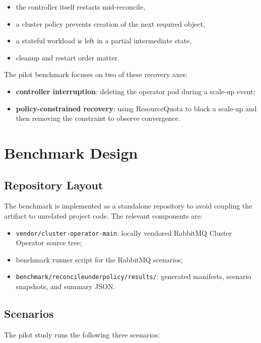 \documentclass[11pt,a4paper]{article}
\begin{document}
\begin{itemize}
  \item the controller itself restarts mid-reconcile,
  \item a cluster policy prevents creation of the next required object,
  \item a stateful workload is left in a partial intermediate state,
  \item cleanup and restart order matter.
\end{itemize}

The pilot benchmark focuses on two of these recovery axes:

\begin{itemize}
  \item \textbf{controller interruption}: deleting the operator pod during a
  scale-up event;
  \item \textbf{policy-constrained recovery}: using ResourceQuota to block a
  scale-up and then removing the constraint to observe convergence.
\end{itemize}

\section{Benchmark Design}

\subsection{Repository Layout}

The benchmark is implemented as a standalone repository to avoid coupling the
artifact to unrelated project code. The relevant components are:

\begin{itemize}
  \item \texttt{vendor/cluster-operator-main}: locally vendored RabbitMQ Cluster
  Operator source tree;
  \item benchmark runner script for the RabbitMQ scenarios;
  \item \texttt{benchmark/reconcileunderpolicy/results/}: generated manifests,
  scenario snapshots, and summary JSON.
\end{itemize}

\subsection{Scenarios}

The pilot study runs the following three scenarios:
\end{document}
